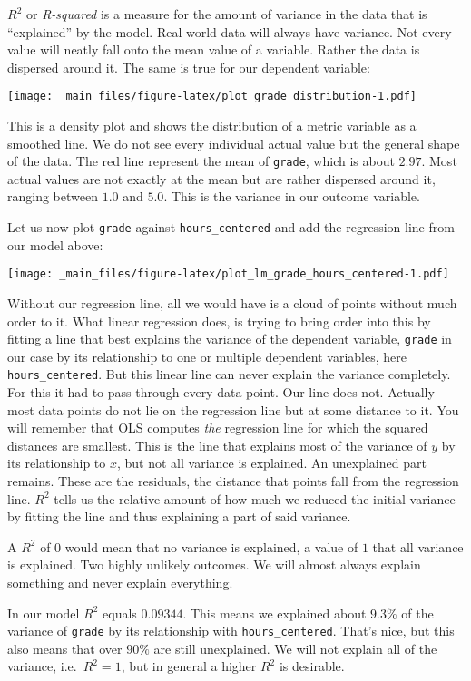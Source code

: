 \documentclass[
]{book}
\begin{document}
\(R^2\) or \emph{R-squared} is a measure for the amount of variance in the data that is
``explained'' by the model. Real world data will always have variance. Not every
value will neatly fall onto the mean value of a variable. Rather the data is
dispersed around it. The same is true for our dependent variable:

\texttt{[image: \_main\_files/figure-latex/plot\_grade\_distribution-1.pdf]}

This is a density plot and shows the distribution of a metric variable as a
smoothed line. We do not see every individual actual value but the general shape
of the data. The red line represent the mean of \texttt{grade}, which is about \(2.97\).
Most actual values are not exactly at the mean but are rather dispersed around
it, ranging between \(1.0\) and \(5.0\). This is the variance in our outcome
variable.

Let us now plot \texttt{grade} against \texttt{hours\_centered} and add the regression line
from our model above:

\texttt{[image: \_main\_files/figure-latex/plot\_lm\_grade\_hours\_centered-1.pdf]}

Without our regression line, all we would have is a cloud of points without much
order to it. What linear regression does, is trying to bring order into this by
fitting a line that best explains the variance of the dependent variable, \texttt{grade}
in our case by its relationship to one or multiple dependent variables, here
\texttt{hours\_centered}.
But this linear line can never explain the variance completely.
For this it had to pass through every data point. Our line does not. Actually
most data points do not lie on the regression line but at some distance to it.
You will remember that OLS computes \emph{the} regression line for which the squared
distances are smallest. This is the line that explains most of the variance of \(y\)
by its relationship to \(x\), but not all variance is explained. An unexplained part
remains. These are the residuals, the distance that points fall from the
regression line. \(R^2\) tells us the relative amount of how much we reduced the
initial variance by fitting the line and thus explaining a part of said
variance.

A \(R^2\) of \(0\) would mean that no variance is explained, a value of \(1\) that all
variance is explained. Two highly unlikely outcomes. We will almost always
explain something and never explain everything.

In our model \(R^2\) equals \(0.09344\). This means we explained about \(9.3\%\) of the
variance of \texttt{grade} by its relationship with \texttt{hours\_centered}. That's nice,
but this also means that over \(90\%\) are still unexplained. We will not explain
all of the variance, i.e.~\(R^2 = 1\), but in general a higher \(R^2\) is desirable.
\end{document}
